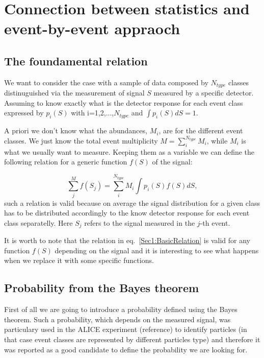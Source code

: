 \section{Connection between statistics and event-by-event appraoch}
\subsection{The foundamental relation}
We want to consider the case with a sample of data composed by $N_{type}$ classes distinuguished via the measurement of signal $S$ measured by a specific detector.
Assuming to know exactly what is the detector response for each event class expressed by $p_{i}(S)$ with i=1,2,...,$N_{type}$ and $\int p_{i}(S) dS = 1$.

A priori we don't know what the abundances, $M_{i}$, are for the different
event classes. We just know the total event multiplicity $M =
\sum\limits_{i}^{N_{type}} M_{i}$, while $M_i$ is what we usually want to measure.
Keeping them as a variable we can define the following relation for a generic function $f(S)$ of the signal:

\begin{equation}
\label{Sec1:BasicRelation}
\sum\limits_{j}^{M} f(S_j) = \sum\limits_{i}^{N_{type}} M_{i} \int p_{i}(S) f(S) dS,
\end{equation}
such a relation is valid because on average the signal distribution for a
given class has to be distributed accordingly to the know detector response
for each event class separatelly. Here  $S_j$ refers to the signal
measured in the $j$-th event.

It is worth to note that the relation in eq.~\ref{Sec1:BasicRelation} is valid
for any function $f(S)$ depending on the signal and
it is interesting to see what happens when we replace it with some specific functions.

\subsection{Probability from the Bayes theorem}
First of all we are going to introduce a probability defined using the Bayes theorem. Such a probability, which depends on the measured signal, was particulary used in the ALICE experiment (reference) to identify particles (in that case event classes are represented by different particles type) and therefore it was reported as a good candidate to define the probability we are looking for.

